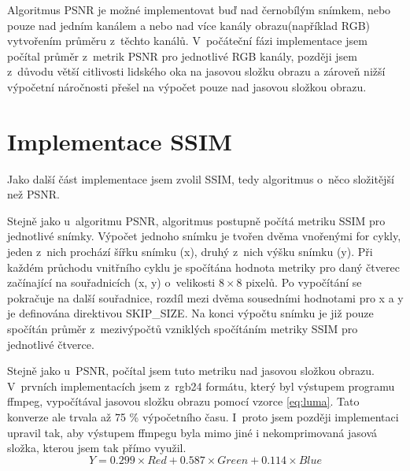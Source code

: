 \documentclass[thesis=M,czech]{FITthesis}[2016/06/26]
\begin{document}
Algoritmus PSNR je možné implementovat buď nad černobílým snímkem, nebo pouze nad jedním kanálem a nebo nad více kanály obrazu(například RGB) vytvořením průměru z~těchto kanálů. V~počáteční fázi implementace jsem počítal průměr z~metrik PSNR pro jednotlivé RGB kanály, později jsem z~důvodu větší citlivosti lidského oka na jasovou složku obrazu a zároveň nižší výpočetní náročnosti přešel na výpočet pouze nad jasovou složkou obrazu.  
\section{Implementace SSIM}
Jako další část implementace jsem zvolil SSIM, tedy algoritmus o~něco složitější než PSNR.

Stejně jako u~algoritmu PSNR, algoritmus postupně počítá metriku SSIM pro jednotlivé snímky. Výpočet jednoho snímku je tvořen dvěma vnořenými for cykly, jeden z~nich prochází šířku snímku (x), druhý z~nich výšku snímku (y). Při každém průchodu vnitřního cyklu je spočítána hodnota metriky pro daný čtverec začínající na souřadnicích (x, y) o~velikosti $8 \times 8$ pixelů. Po vypočítání se pokračuje na další souřadnice, rozdíl mezi dvěma sousedními hodnotami pro x a y je definována direktivou SKIP\_SIZE. Na konci výpočtu snímku je již pouze spočítán průměr z~mezivýpočtů vzniklých spočítáním metriky SSIM pro jednotlivé čtverce.

Stejně jako u~PSNR, počítal jsem tuto metriku nad jasovou složkou obrazu. V~prvních implementacích jsem z~rgb24 formátu, který byl výstupem programu ffmpeg, vypočítával jasovou složku obrazu pomocí vzorce \ref{eq:luma}. Tato konverze ale trvala až 75 \% výpočetního času. I~proto jsem později implementaci upravil tak, aby výstupem ffmpegu byla mimo jiné i nekomprimovaná jasová složka, kterou jsem tak přímo využil.
\begin{equation}  \label{eq:luma}
Y = 0.299 \times Red + 0.587 \times Green + 0.114 \times Blue
\end{equation}
\end{document}
